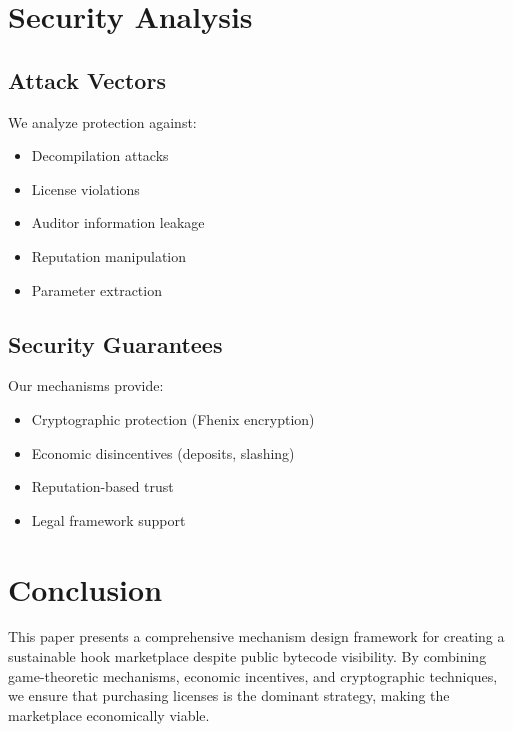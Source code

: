 \documentclass[11pt,a4paper]{article}
\theoremstyle{definition}
\theoremstyle{remark}
\begin{document}
\section{Security Analysis}
\label{sec:security}

\subsection{Attack Vectors}

We analyze protection against:
\begin{itemize}
    \item Decompilation attacks
    \item License violations
    \item Auditor information leakage
    \item Reputation manipulation
    \item Parameter extraction
\end{itemize}

\subsection{Security Guarantees}

Our mechanisms provide:
\begin{itemize}
    \item Cryptographic protection (Fhenix encryption)
    \item Economic disincentives (deposits, slashing)
    \item Reputation-based trust
    \item Legal framework support
\end{itemize}


\section{Conclusion}
\label{sec:conclusion}

This paper presents a comprehensive mechanism design framework for creating a sustainable hook marketplace despite public bytecode visibility. By combining game-theoretic mechanisms, economic incentives, and cryptographic techniques, we ensure that purchasing licenses is the dominant strategy, making the marketplace economically viable.
\end{document}
